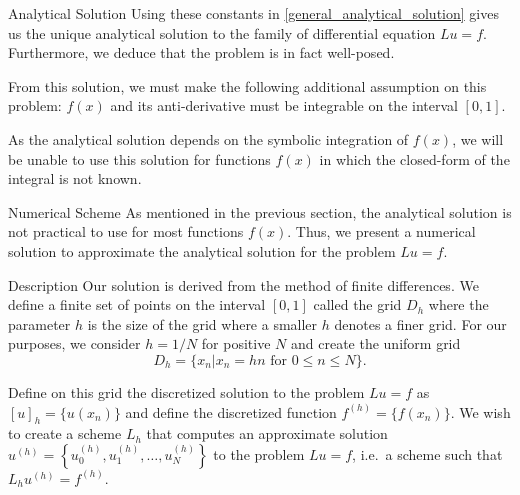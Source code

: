 \documentclass{article}
\begin{document}
\begin{section}{Analytical Solution}
  Using these constants in \eqref{general_analytical_solution} gives us the
  unique analytical solution to the family of differential equation $Lu = f$.
  Furthermore, we deduce that the problem is in fact well-posed.

  From this solution, we must make the following additional assumption on this
  problem: $f(x)$ and its anti-derivative must be integrable on the interval $[0, 1]$.

  As the analytical solution depends on the symbolic integration of $f(x)$, we
  will be unable to use this solution for functions $f(x)$ in which the
  closed-form of the integral is not known.
\end{section}


\begin{section}{Numerical Scheme}\label{sec:scheme}
  As mentioned in the previous section, the analytical solution is not practical
  to use for most functions $f(x)$. Thus, we present a numerical solution to
  approximate the analytical solution for the problem $Lu = f$.

  \begin{subsection}{Description}
    Our solution is derived from the method of finite differences. We define
    a finite set of points on the interval $[0, 1]$ called the grid $D_h$ where
    the parameter $h$ is the size of the grid where a smaller $h$ denotes a finer
    grid. For our purposes, we consider $h=1/N$ for positive $N$ and
    create the uniform grid
    \[
      D_h = \{x_n| x_n = hn \text{ for $0 \leq n \leq N$}\}.
    \]

    Define on this grid the discretized solution to the problem $Lu = f$ as
    $[u]_h = \{u(x_n)\}$ and define the discretized function $f^{(h)} = \{f(x_n)\}$.
    We wish to create a scheme $L_h$ that computes an approximate solution
    $u^{(h)} = \left\{u_0^{(h)}, u_1^{(h)}, \dots, u_N^{(h)}\right\}$ to the problem
    $Lu = f$, i.e.\ a scheme such that $L_h u^{(h)} = f^{(h)}$.


\end{subsection}
\end{section}
\end{document}
